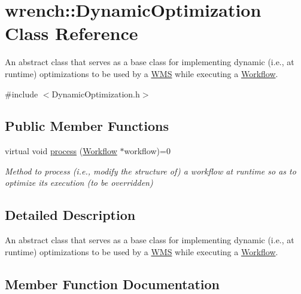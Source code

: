 \hypertarget{classwrench_1_1_dynamic_optimization}{}\section{wrench\+:\+:Dynamic\+Optimization Class Reference}
\label{classwrench_1_1_dynamic_optimization}


An abstract class that serves as a base class for implementing dynamic (i.\+e., at runtime) optimizations to be used by a \hyperlink{classwrench_1_1_w_m_s}{W\+MS} while executing a \hyperlink{classwrench_1_1_workflow}{Workflow}.  




{\ttfamily \#include $<$Dynamic\+Optimization.\+h$>$}

\subsection*{Public Member Functions}
\begin{DoxyCompactItemize}
\item 
virtual void \hyperlink{classwrench_1_1_dynamic_optimization_a996a15c4c05df94fdf01303bea4bb6aa}{process} (\hyperlink{classwrench_1_1_workflow}{Workflow} $\ast$workflow)=0
\begin{DoxyCompactList}\small\item\em Method to process (i.\+e., modify the structure of) a workflow at runtime so as to optimize its execution (to be overridden) \end{DoxyCompactList}\end{DoxyCompactItemize}


\subsection{Detailed Description}
An abstract class that serves as a base class for implementing dynamic (i.\+e., at runtime) optimizations to be used by a \hyperlink{classwrench_1_1_w_m_s}{W\+MS} while executing a \hyperlink{classwrench_1_1_workflow}{Workflow}. 

\subsection{Member Function Documentation}
\mbox{\label{classwrench_1_1_dynamic_optimization_a996a15c4c05df94fdf01303bea4bb6aa}} 

